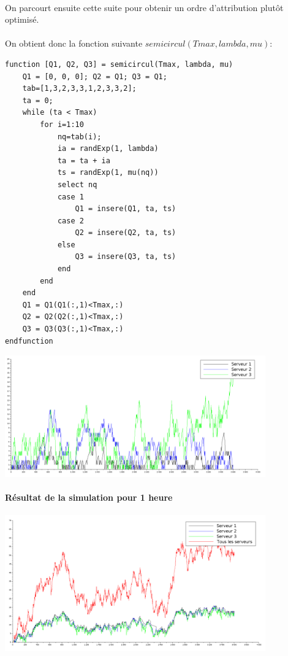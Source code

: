 \documentclass{article}
\begin{document}
\paragraph{}
On parcourt ensuite cette suite pour obtenir un ordre d'attribution plutôt optimisé.

\paragraph{}On obtient donc la fonction suivante $semicircul(Tmax,lambda,mu)$:
\begin{verbatim}
function [Q1, Q2, Q3] = semicircul(Tmax, lambda, mu)
    Q1 = [0, 0, 0]; Q2 = Q1; Q3 = Q1;
    tab=[1,3,2,3,3,1,2,3,3,2];  
    ta = 0;
    while (ta < Tmax)
        for i=1:10
            nq=tab(i);
            ia = randExp(1, lambda) 
            ta = ta + ia 
            ts = randExp(1, mu(nq)) 
            select nq 
            case 1 
                Q1 = insere(Q1, ta, ts)
            case 2
                Q2 = insere(Q2, ta, ts)
            else
                Q3 = insere(Q3, ta, ts)
            end
        end
    end
    Q1 = Q1(Q1(:,1)<Tmax,:)
    Q2 = Q2(Q2(:,1)<Tmax,:) 
    Q3 = Q3(Q3(:,1)<Tmax,:) 
endfunction 
\end{verbatim}


\begin{center}
	\includegraphics[width=425px]{img/semiCirculaire.png}
\end{center}
\paragraph{Résultat de la simulation pour 1 heure}

\begin{center}
	\includegraphics[width=425px]{img/sctls.png}
\end{center}
\end{document}
